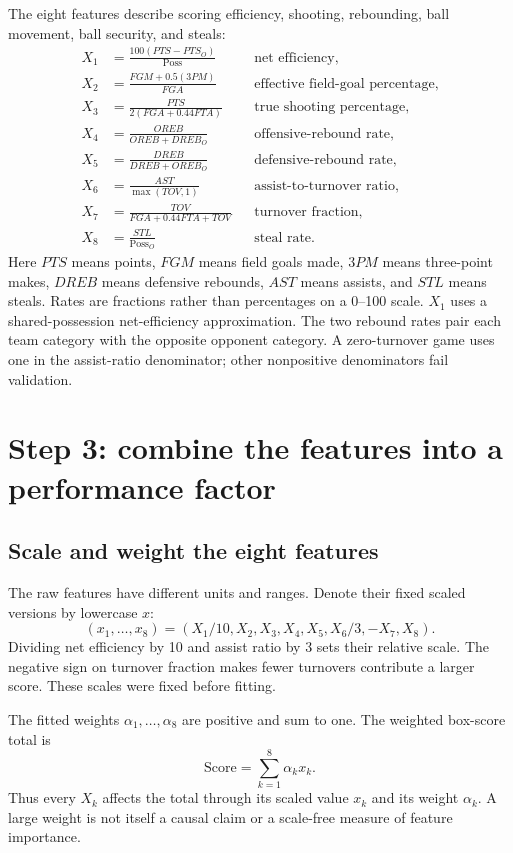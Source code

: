 \documentclass[11pt]{article}
\begin{document}
The eight features describe scoring efficiency, shooting, rebounding,
ball movement, ball security, and steals:
\begin{align}
 X_1&=\frac{100(PTS-PTS_O)}{\mathrm{Poss}}
 &&\text{net efficiency},\\
 X_2&=\frac{FGM+0.5(3PM)}{FGA}
 &&\text{effective field-goal percentage},\\
 X_3&=\frac{PTS}{2(FGA+0.44FTA)}
 &&\text{true shooting percentage},\\
 X_4&=\frac{OREB}{OREB+DREB_O}
 &&\text{offensive-rebound rate},\\
 X_5&=\frac{DREB}{DREB+OREB_O}
 &&\text{defensive-rebound rate},\\
 X_6&=\frac{AST}{\max(TOV,1)}
 &&\text{assist-to-turnover ratio},\\
 X_7&=\frac{TOV}{FGA+0.44FTA+TOV}
 &&\text{turnover fraction},\\
 X_8&=\frac{STL}{\mathrm{Poss}_O}
 &&\text{steal rate}.
\end{align}
Here $PTS$ means points, $FGM$ means field goals made, $3PM$ means three-point
makes, $DREB$ means defensive rebounds, $AST$ means assists, and $STL$ means
steals. Rates are fractions rather than percentages on a 0--100 scale.
$X_1$ uses a shared-possession net-efficiency approximation. The two rebound
rates pair each team category with the opposite opponent category. A
zero-turnover game uses one in the assist-ratio denominator; other
nonpositive denominators fail validation.

\section{Step 3: combine the features into a performance factor}\label{sec:performance}
\subsection{Scale and weight the eight features}
The raw features have different units and ranges. Denote their fixed scaled
versions by lowercase $x$:
\begin{equation}\label{eq:scaled-features}
 (x_1,\ldots,x_8)=(X_1/10,X_2,X_3,X_4,X_5,X_6/3,-X_7,X_8).
\end{equation}
Dividing net efficiency by 10 and assist ratio by 3 sets their relative scale.
The negative sign on turnover fraction makes fewer turnovers contribute a
larger score. These scales were fixed before fitting.

The fitted weights $\alpha_1,\ldots,\alpha_8$ are positive and sum to one.
The weighted box-score total is
\begin{equation}\label{eq:game-score}
 \mathrm{Score}=\sum_{k=1}^{8}\alpha_k x_k.
\end{equation}
Thus every $X_k$ affects the total through its scaled value $x_k$ and its
weight $\alpha_k$. A large weight is not itself a causal claim or a scale-free
measure of feature importance.
\end{document}
